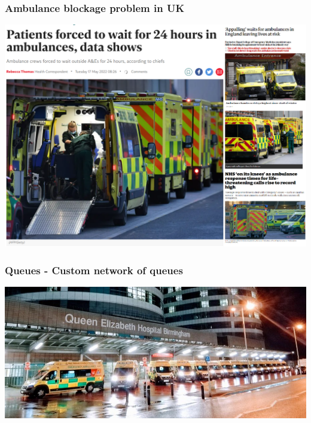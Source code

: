 \begin{frame}
    \frametitle{Ambulance blockage problem in UK}
    \centering

    \includegraphics[scale=0.3]{Bin/ambulance_pics/articles.PNG}
        
\end{frame}



\begin{frame}
    \frametitle{Queues - Custom network of queues}
    \centering

    \includegraphics[scale=0.45]{Bin/ambulance_pics/ambulance_queue.jpg}
\end{frame}

